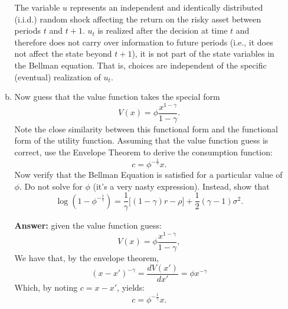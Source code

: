 \documentclass[11pt]{extarticle}
\theoremstyle{plain}
\theoremstyle{definition}
\begin{document}
\begin{enumerate}[(a)]
\begin{enumerate}[(a)]
The variable \(u\) represents an independent and identically distributed (i.i.d.) random shock affecting the return on the risky asset between periods \(t\) and \(t+1\). \(u_t\) is realized after the decision at time \(t\) and therefore does not carry over information to future periods (i.e., it does not affect the state beyond \(t+1\)), it is not part of the state variables in the Bellman equation. That is, choices are independent of the specific (eventual) realization of \(u_t\).

\item Now guess that the value function takes the special form
\begin{equation*}
	V(x) = \phi \frac{x^{1-\gamma}}{1-\gamma} .
\end{equation*}
Note the close similarity between this functional form and the functional form of the utility function. Assuming that the value function guess is correct, use the Envelope Theorem to derive the consumption function:
\begin{equation*}
c=\phi^{-\frac{1}{\gamma}} x .
\end{equation*}
Now verify that the Bellman Equation is satisfied for a particular value of $\phi$. Do not solve for $\phi$ (it's a very nasty expression). Instead, show that
\begin{equation*}
	\log (1 - \phi^{-\frac{1}{\gamma}}) = \frac{1}{\gamma} \Big[ (1-\gamma) r - \rho \Big] + \frac{1}{2}(\gamma-1) \sigma^2.
\end{equation*}

\textbf{Answer:}  given the value function guess:
\[
V(x) = \phi \frac{x^{1 - \gamma}}{1 - \gamma},
\]
We have that, by the envelope theorem, $$(x-x')^{-\gamma} = \frac{dV(x')}{dx'} = \phi x ^{-\gamma}$$
Which, by noting $c=x-x'$, yields: 
\begin{equation*}
c=\phi^{-\frac{1}{\gamma}} x .
\end{equation*}


\end{enumerate}
\end{enumerate}
\end{document}
